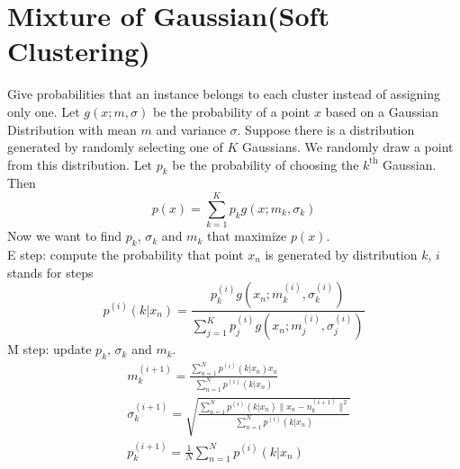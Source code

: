 \documentclass{article}
\begin{document}
    \section{Mixture of Gaussian(Soft Clustering)}
        Give probabilities that an instance belongs to each cluster instead of assigning only one. Let $g(x;m,\sigma)$ be the probability of a point $x$ based on a Gaussian Distribution with mean $m$ and variance $\sigma$. Suppose there is a distribution generated by randomly selecting one of $K$ Gaussians. We randomly draw a point from this distribution. Let $p_k$ be the probability of choosing the $k^\mathrm{th}$ Gaussian. Then
        \[
            p(x)=\sum_{k=1}^Kp_kg(x;m_k,\sigma_k)
        \]
        Now we want to find $p_k$, $\sigma_k$ and $m_k$ that maximize $p(x)$.\\
        E step: compute the probability that point $x_n$ is generated by distribution $k$, $i$ stands for steps
        \[
            p^{(i)}(k|x_n)=\frac{p^{(i)}_kg(x_n;m^{(i)}_k,\sigma^{(i)}_k)}{\sum_{j=1}^Kp^{(i)}_jg(x_n;m^{(i)}_j,\sigma^{(i)}_j)}
        \]
        M step: update $p_k$, $\sigma_k$ and $m_k$.
        \begin{align*}
            &m_k^{(i+1)} = \frac{\sum_{n=1}^Np^{(i)}(k|x_n)x_n}{\sum_{n=1}^Np^{(i)}(k|x_n)}\\
            &\sigma^{(i+1)}_k = \sqrt{\frac{\sum_{n=1}^Np^{(i)}(k|x_n)\|x_n-n^{(i+1)}_k\|^2}{\sum_{n=1}^Np^{(i)}(k|x_n)}}\\
            &p^{(i+1)}_k=\frac{1}{N}\sum_{n=1}^Np^{(i)}(k|x_n)
        \end{align*}
\end{document}
